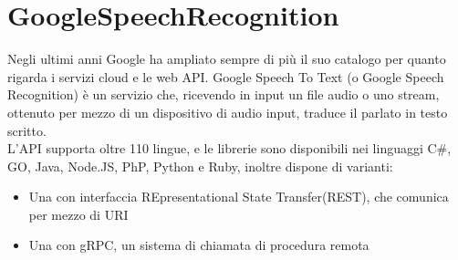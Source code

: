 \section{GoogleSpeechRecognition}
Negli ultimi anni Google ha ampliato sempre di più il suo catalogo per quanto rigarda
i servizi cloud e le web API. Google Speech To Text (o Google Speech Recognition) è un
servizio che, ricevendo in input un file audio o uno stream, ottenuto per mezzo di un
dispositivo di audio input, traduce il parlato in testo scritto.\\
L'API supporta oltre 110 lingue, e le librerie sono disponibili nei linguaggi C\#, GO, Java, Node.JS,
PhP, Python e Ruby, inoltre dispone di varianti:
\begin{itemize}
\item Una con interfaccia REpresentational State Transfer(REST), che comunica per mezzo di URI
\item Una con gRPC, un sistema di chiamata di procedura remota
\end{itemize}
